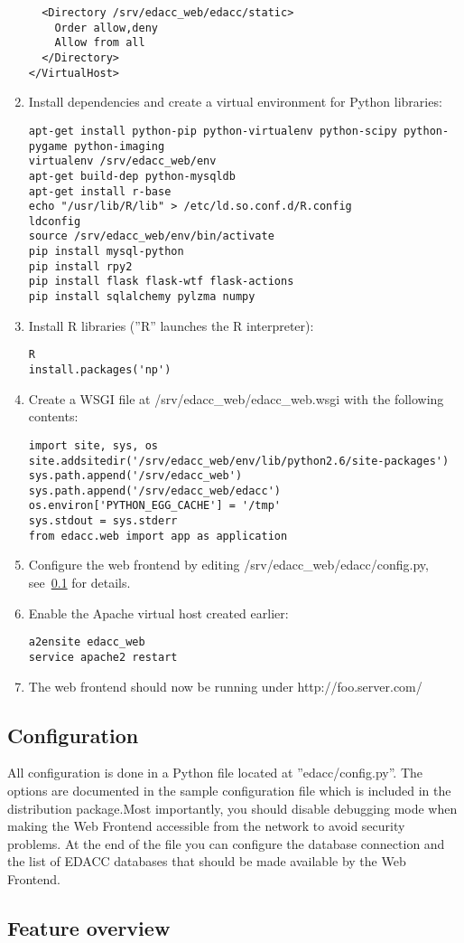 \begin{enumerate}
{\begin{verbatim}
  <Directory /srv/edacc_web/edacc/static>
    Order allow,deny
    Allow from all
  </Directory>
</VirtualHost>
\end{verbatim}
}
\item{Install dependencies and create a virtual environment for Python libraries:
\begin{verbatim}
apt-get install python-pip python-virtualenv python-scipy python-pygame python-imaging
virtualenv /srv/edacc_web/env
apt-get build-dep python-mysqldb
apt-get install r-base
echo "/usr/lib/R/lib" > /etc/ld.so.conf.d/R.config
ldconfig
source /srv/edacc_web/env/bin/activate
pip install mysql-python
pip install rpy2
pip install flask flask-wtf flask-actions
pip install sqlalchemy pylzma numpy
\end{verbatim}
}
\item{Install R libraries (''R'' launches the R interpreter):
\begin{verbatim}
R
install.packages('np')
\end{verbatim}
}
\item{Create a WSGI file at /srv/edacc\_web/edacc\_web.wsgi with the following contents:
\begin{verbatim}
import site, sys, os
site.addsitedir('/srv/edacc_web/env/lib/python2.6/site-packages')
sys.path.append('/srv/edacc_web')
sys.path.append('/srv/edacc_web/edacc')
os.environ['PYTHON_EGG_CACHE'] = '/tmp'
sys.stdout = sys.stderr
from edacc.web import app as application
\end{verbatim}
}
\item Configure the web frontend by editing /srv/edacc\_web/edacc/config.py, see~\ref{wf:configuration} for details.
\item{Enable the Apache virtual host created earlier:
\begin{verbatim}
a2ensite edacc_web
service apache2 restart
\end{verbatim}
}
\item The web frontend should now be running under http://foo.server.com/
\end{enumerate}

\subsection{Configuration}
\label{wf:configuration}
All configuration is done in a Python file located at ''edacc/config.py''. The options are documented in the sample configuration
file which is included in the distribution package.\attention Most importantly, you should disable debugging mode when making the Web Frontend
accessible from the network to avoid security problems. At the end of the file you can configure the database connection and the list
of EDACC databases that should be made available by the Web Frontend.

\subsection{Feature overview}